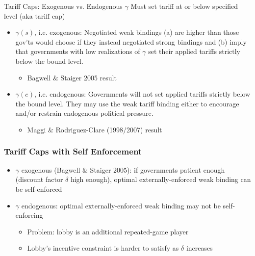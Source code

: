 \documentclass[handout]{beamer}
\newcommand{\ga}{\gamma}
\newcommand{\de}{\delta}
\begin{document}
{\begin{frame}{Tariff Caps: Exogenous vs. Endogenous $\ga$}
\pause
Must set tariff at or below specified level (aka tariff cap)
\pause
\begin{itemize}[<+->]
	\item $\ga(s)$, i.e. exogenous: Negotiated weak bindings (a) are higher than those gov'ts would choose if they instead negotiated strong bindings and (b) imply that governments with low realizations of $\ga$ set their applied tariffs strictly below the bound level.
		\begin{itemize}
			\item Bagwell $\&$ Staiger 2005 result
		\end{itemize}

	\item $\ga(e)$, i.e. endogenous: Governments will not set applied tariffs strictly below the bound level. They may use the weak tariff binding either to encourage and/or restrain endogenous political pressure.
		\begin{itemize}
			\item Maggi $\&$ Rodriguez-Clare (1998/2007) result
		\end{itemize}

\end{itemize}
\end{frame}


\begin{frame}[label=self]
\frametitle{Tariff Caps with Self Enforcement}
\pause
\begin{itemize}[<+->]
	\item $\ga$ exogenous (Bagwell $\&$ Staiger 2005): if governments patient enough (discount factor $\de$ high enough), optimal externally-enforced weak binding can be self-enforced
  \item $\ga$ endogenous: optimal externally-enforced weak binding may not be self-enforcing
		\begin{itemize}
			\item Problem: lobby is an additional repeated-game player
			\item Lobby's incentive constraint is harder to satisfy as $\de$ increases
		\end{itemize}
	 
\end{itemize}
\pause
\end{frame}




}
\end{document}
